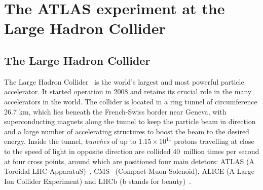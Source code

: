 
\chapter{The ATLAS experiment at the Large Hadron Collider}
\section{The Large Hadron Collider}

The Large Hadron Collider~\cite{Evans:2008zzb} is the world's 
largest and most powerful particle accelerator. 
It started operation in 2008 and retains its crucial role in the many 
accelerators in the world.
The collider is located in a ring tunnel of 
circumference 26.7 km, which lies beneath the 
French-Swiss border near Geneva, with superconducting magnets 
along the tunnel to keep the particle beam in direction
and a large number of accelerating structures to boost the 
beam to the desired energy.
Inside the tunnel, \textit{bunches} of up to $1.15 \times 10^{11}$ protons
travelling at close to the speed of light in opposite direction 
are collided 40~million times per second at four cross points,
around which are positioned four main detetors: 
ATLAS (A Toroidal LHC ApparatuS)~\cite{PERF-2007-01}, 
CMS~\cite{CMS-2008xjf} (Compact Muon Solenoid), ALICE (A Large Ion Collider Experiment) 
\cite{ALICE-2008ngc} and LHCb (b stands for beauty)~\cite{LHCb-2008vvz}.








